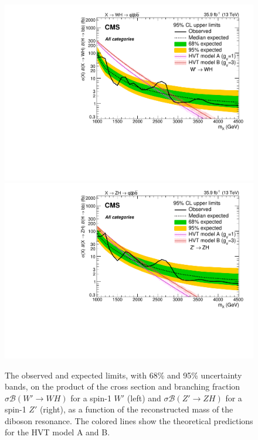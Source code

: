 \begin{figure}[!htb]
  \centering
    \includegraphics[width=.495\textwidth]{figures/B2G-17-002/CMS-B2G-17-002_Figure_005-a.pdf}%
    \includegraphics[width=.495\textwidth]{figures/B2G-17-002/CMS-B2G-17-002_Figure_005-b.pdf}
  \caption{The observed and expected limits, with 68\% and 95\% uncertainty bands, on the product of the cross section and branching fraction $\sigma \mathcal{B} (W' \rightarrow WH)$ for a spin-1 $W'$ (left) and $\sigma \mathcal{B} (Z' \rightarrow ZH)$ for a spin-1 $Z'$ (right), as a function of the reconstructed mass of the diboson resonance. The colored lines show the theoretical predictions for the HVT model A and B.}
  \label{fig:theory_B2G-17-002}
\end{figure}

